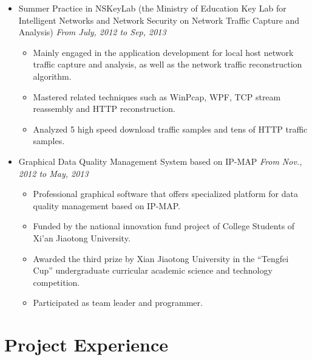 \documentclass[a4paper,11pt]{article}
\begin{document}
\begin{itemize}
    \item Summer Practice in NSKeyLab (the Ministry of Education Key Lab for Intelligent Networks and Network
    Security on Network Traffic Capture and Analysis) \hfill \textit{From July, 2012 to Sep, 2013}
    \begin{itemize}
        \item Mainly engaged in the application development for local host network traffic capture and
analysis, as well as the network traffic reconstruction algorithm.
        \item Mastered related techniques such as WinPcap, WPF, TCP stream reassembly and HTTP reconstruction.
        \item Analyzed 5 high speed download traffic samples and tens of HTTP traffic samples.
    \end{itemize}

    \item Graphical Data Quality Management System based on IP-MAP \hfill \textit{From Nov., 2012 to May,
2013}
    \begin{itemize}
        \item Professional graphical software that offers specialized platform for data quality management based on IP-MAP.
        \item Funded by the national innovation fund project of College Students of Xi’an Jiaotong University.
        \item Awarded the third prize by Xian Jiaotong University in the “Tengfei Cup” undergraduate
curricular academic science and technology competition.
        \item Participated as team leader and programmer.
    \end{itemize}
\end{itemize}


\section{Project Experience}
\end{document}
